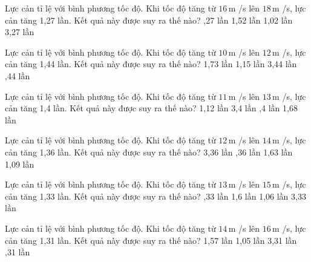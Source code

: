 \begin{ex}
Lực cản tỉ lệ với bình phương tốc độ. Khi tốc độ tăng từ $16\,\text{m}$ /s lên $18\,\text{m}$ /s, lực cản tăng 1,27 lần. Kết quả này được suy ra thế nào?
\choice
{,27 lần}
{1,52 lần}
{1,02 lần}
{3,27 lần}
\end{ex}

\begin{ex}
Lực cản tỉ lệ với bình phương tốc độ. Khi tốc độ tăng từ $10\,\text{m}$ /s lên $12\,\text{m}$ /s, lực cản tăng 1,44 lần. Kết quả này được suy ra thế nào?
\choice
{1,73 lần}
{1,15 lần}
{3,44 lần}
{,44 lần}
\end{ex}

\begin{ex}
Lực cản tỉ lệ với bình phương tốc độ. Khi tốc độ tăng từ $11\,\text{m}$ /s lên $13\,\text{m}$ /s, lực cản tăng 1,4 lần. Kết quả này được suy ra thế nào?
\choice
{1,12 lần}
{3,4 lần}
{,4 lần}
{1,68 lần}
\end{ex}

\begin{ex}
Lực cản tỉ lệ với bình phương tốc độ. Khi tốc độ tăng từ $12\,\text{m}$ /s lên $14\,\text{m}$ /s, lực cản tăng 1,36 lần. Kết quả này được suy ra thế nào?
\choice
{3,36 lần}
{,36 lần}
{1,63 lần}
{1,09 lần}
\end{ex}

\begin{ex}
Lực cản tỉ lệ với bình phương tốc độ. Khi tốc độ tăng từ $13\,\text{m}$ /s lên $15\,\text{m}$ /s, lực cản tăng 1,33 lần. Kết quả này được suy ra thế nào?
\choice
{,33 lần}
{1,6 lần}
{1,06 lần}
{3,33 lần}
\end{ex}

\begin{ex}
Lực cản tỉ lệ với bình phương tốc độ. Khi tốc độ tăng từ $14\,\text{m}$ /s lên $16\,\text{m}$ /s, lực cản tăng 1,31 lần. Kết quả này được suy ra thế nào?
\choice
{1,57 lần}
{1,05 lần}
{3,31 lần}
{,31 lần}
\end{ex}


